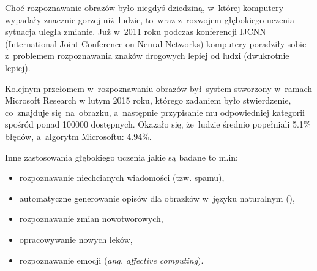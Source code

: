 Choć rozpoznawanie obrazów było niegdyś dziedziną, w~której komputery wypadały
znacznie gorzej niż~ludzie, to~wraz z~rozwojem głębokiego uczenia sytuacja
uległa zmianie. Już w~2011 roku podczas konferencji IJCNN (International Joint
Conference on Neural Networks) komputery poradziły sobie z~problemem
rozpoznawania znaków drogowych lepiej od ludzi (dwukrotnie lepiej).

Kolejnym przełomem w~rozpoznawaniu obrazów był~system stworzony w~ramach
Microsoft Research w lutym 2015 roku, którego zadaniem było stwierdzenie,
co~znajduje się~na~obrazku, a~następnie przypisanie mu odpowiedniej kategorii spośród
ponad 100000 dostępnych. Okazało się, że~ludzie średnio popełniali 5.1\% błędów,
a~algorytm Microsoftu: 4.94\%.

Inne zastosowania głębokiego uczenia jakie są badane to m.in:
\begin{itemize}
  \item rozpoznawanie niechcianych wiadomości (tzw. spamu),
  \item automatyczne generowanie opisów dla obrazków w~języku naturalnym (\cite{img-desc-generator}),
  \item rozpoznawanie zmian nowotworowych,
  \item opracowywanie nowych leków,
  \item rozpoznawanie emocji (\textit{ang. affective computing}).
\end{itemize}
